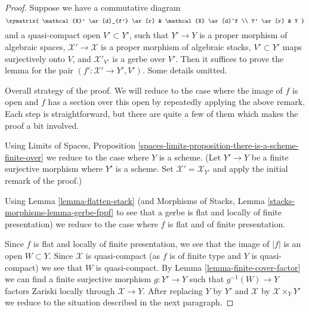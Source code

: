 \begin{proof}
Suppose we have a commutative diagram
$$
\xymatrix{
\mathcal{X}' \ar[d]_{f'} \ar[r] & \mathcal{X} \ar[d]^f \\
Y' \ar[r] & Y
}
$$
and a quasi-compact open $V' \subset Y'$, such that
$Y' \to Y$ is a proper morphism of algebraic spaces,
$\mathcal{X}' \to \mathcal{X}$ is a proper morphism of algebraic stacks,
$V' \subset Y'$ maps surjectively onto $V$, and
$\mathcal{X}'_{V'}$ is a gerbe over $V'$.
Then it suffices to prove the lemma for the pair
$(f' : \mathcal{X}' \to Y', V')$. Some details omitted.

\medskip\noindent
Overall strategy of the proof. We will reduce
to the case where the image of $f$ is open and $f$
has a section over this open by repeatedly applying the
above remark. Each step is straightforward, but there are
quite a few of them which makes the proof a bit involved.

\medskip\noindent
Using Limits of Spaces, Proposition
\ref{spaces-limits-proposition-there-is-a-scheme-finite-over}
we reduce to the case where $Y$ is a scheme.
(Let $Y' \to Y$ be a finite surjective morphism where $Y'$ is
a scheme. Set $\mathcal{X}' = \mathcal{X}_{Y'}$ and apply
the initial remark of the proof.)

\medskip\noindent
Using Lemma \ref{lemma-flatten-stack}
(and Morphisms of Stacks, Lemma \ref{stacks-morphisms-lemma-gerbe-fppf}
to see that a gerbe is flat and locally of finite presentation)
we reduce to the case where $f$ is flat and of finite presentation.

\medskip\noindent
Since $f$ is flat and locally of finite
presentation, we see that the image of $|f|$ is an open $W \subset Y$.
Since $\mathcal{X}$ is quasi-compact (as $f$ is of finite type
and $Y$ is quasi-compact) we see that $W$ is quasi-compact.
By Lemma \ref{lemma-finite-cover-factor}
we can find a finite surjective morphism $g : Y' \to Y$
such that $g^{-1}(W) \to Y$ factors Zariski locally
through $\mathcal{X} \to Y$.
After replacing $Y$ by $Y'$ and $\mathcal{X}$ by
$\mathcal{X} \times_Y Y'$ we reduce to the situation
described in the next paragraph.


\end{proof}
